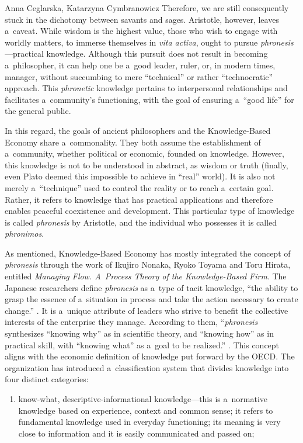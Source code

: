 \begin{artengenv2auth}{Anna Ceglarska, Katarzyna Cymbranowicz}
Therefore, we are still consequently stuck in the dichotomy between savants and sages. Aristotle, however, leaves a~caveat. While wisdom is the highest value, those who wish to engage with worldly matters, to immerse themselves in \textit{vita activa}, ought to pursue \textit{phronesis}---practical knowledge. Although this pursuit does not result in becoming a~philosopher, it can help one be a~good leader, ruler, or, in modern times, manager, without succumbing to mere ``technical'' or rather ``technocratic'' approach. This \textit{phronetic} knowledge pertains to interpersonal relationships and facilitates a~community's functioning, with the goal of ensuring a~``good life'' for the general public.



In this regard, the goals of ancient philosophers and the Knowledge-Based Economy share a~commonality. They both assume the establishment of a~community, whether political or economic, founded on knowledge. However, this knowledge is not to be understood in abstract, as wisdom or truth (finally, even Plato deemed this impossible to achieve in ``real'' world). It is also not merely a~``technique'' used to control the reality or to reach a~certain goal. Rather, it refers to knowledge that has practical applications and therefore enables peaceful coexistence and development. This particular type of knowledge is called \textit{phronesis} by Aristotle, and the individual who possesses it is called \textit{phronimos}.



As mentioned, Knowledge-Based Economy has mostly integrated the concept of \textit{phronesis} through the work of Ikujiro Nonaka, Ryoko Toyama and Toru Hirata, entitled \textit{Managing Flow. A~Process Theory of the Knowledge-Based Firm}. The Japanese researchers define \textit{phronesis} as a~type of tacit knowledge, ``the ability to grasp the essence of a~situation in process and take the action necessary to create change.'' 
\parencite[][p.4]{nonaka_managing_2008}. %
 It is a~unique attribute of leaders who strive to benefit the collective interests of the enterprise they manage. According to them, ``\textit{phronesis} synthesizes ``knowing why'' as in scientific theory, and ``knowing how'' as in practical skill, with ``knowing what'' as a~goal to be realized.'' 
\parencite[][pp.14–15]{nonaka_managing_2008}. %
 This concept aligns with the economic definition of knowledge put forward by the OECD. The organization has introduced a~classification system that divides knowledge into four distinct categories:
\begin{enumerate}
\item know-what, descriptive-informational knowledge---this is a~normative knowledge based on experience, context and common sense; it refers to fundamental knowledge used in everyday functioning; its meaning is very close to information and it is easily communicated and passed on;


\end{enumerate}
\end{artengenv2auth}
